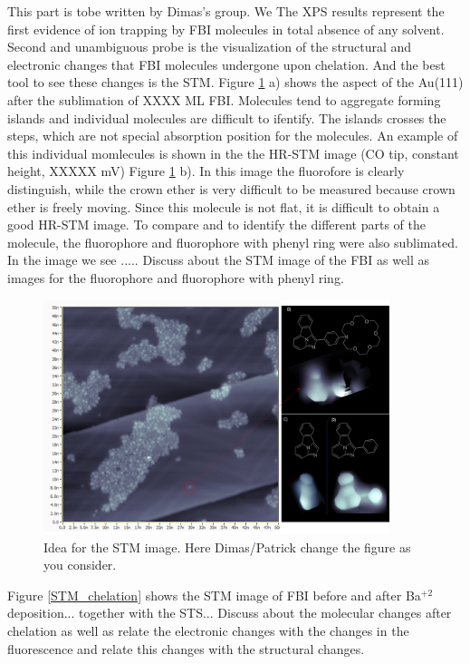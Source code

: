\documentclass[aps,prl,reprint,longbibliography,superscriptaddress]{revtex4-1}
\def\Ba{Ba$^{+2}$ }
\newcommand{\completar}[1]{{\color{red} #1}}
\begin{document}
\completar{This part is tobe written by Dimas's group. We } The XPS results represent the first evidence of ion trapping by FBI molecules in total absence of any solvent. Second and unambiguous probe is the visualization of the structural and electronic changes that FBI molecules undergone upon chelation. And the best tool to see these changes is the STM. Figure \ref{STM_FBI_fluorophore} a) shows the aspect of the Au(111) after the sublimation of XXXX ML FBI. Molecules tend to aggregate forming islands and individual molecules are difficult to ifentify. The islands crosses the steps, which are not special absorption position for the molecules. An example of this individual momlecules is shown in the the HR-STM image (CO tip, constant height, XXXXX mV) Figure \ref{STM_FBI_fluorophore} b). In this image the fluorofore is clearly distinguish, while the crown ether is very difficult to be measured because crown ether is freely moving. 
Since this molecule is not flat, it is difficult to obtain a good HR-STM image. To compare and to identify the different parts of the molecule, the fluorophore and fluorophore with phenyl ring were also sublimated. In the image we see ..... \completar{Discuss about the STM image of the FBI as well as images for the fluorophore and fluorophore with phenyl ring.}

\begin{figure}[ht!]
	\includegraphics[width=0.9\textwidth]{figures/STM_FBI_fluoroforos.png}
	\caption{\label{STM_FBI_fluorophore} 
    Idea for the STM image. Here Dimas/Patrick change the figure as you consider. }
\end{figure}  

Figure \ref{STM_chelation} shows the STM image of FBI before and after \Ba deposition... together with the STS... \completar{Discuss about the molecular changes after chelation as well as relate the electronic changes with the changes in the fluorescence and relate this changes with the structural changes.}
\end{document}
